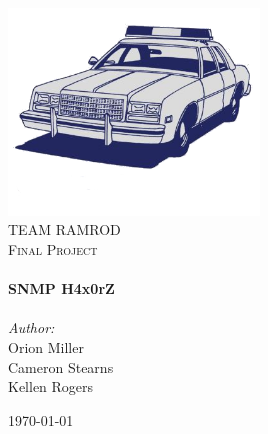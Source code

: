 

\begin{titlepage}
\begin{center}

\includegraphics[width=0.5\textwidth]{./figures/logo.png}
\\[1cm]

\textsc{\LARGE TEAM RAMROD}\\[1.5cm]

\textsc{\Large Final Project}\\[0.5cm]

\HRule \\[0.4cm]
{\Huge \bfseries SNMP H4x0rZ}\\[0.4cm]
\HRule \\[1.5cm]

{\large
 \emph{Author:}\\
 Orion Miller\\
 Cameron Stearns\\
 Kellen Rogers\\
}

\vfill

{\large \today}

\end{center}
\end{titlepage}
